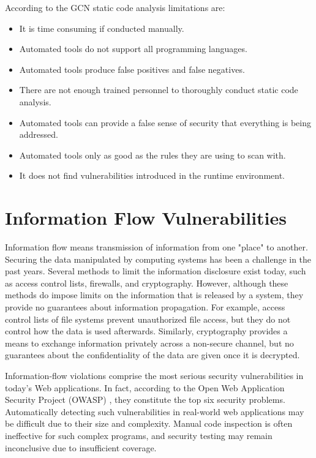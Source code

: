 According to the GCN \cite{ref_87_gcn:gcn} static code analysis limitations are:
\begin{itemize}
	\item It is time consuming if conducted manually.
	\item Automated tools do not support all programming languages.
	\item Automated tools produce false positives and false negatives.
	\item There are not enough trained personnel to thoroughly conduct static code analysis.
	\item Automated tools can provide a false sense of security that everything is being addressed.
	\item Automated tools only as good as the rules they are using to scan with.
	\item It does not find vulnerabilities introduced in the runtime environment.
\end{itemize}

\section{Information Flow Vulnerabilities}

Information flow means  transmission of information from one "place" to another. Securing the data manipulated by computing systems has been a challenge in the past years. Several methods to limit the information disclosure exist today, such as access control lists, firewalls, and cryptography. However, although these methods do impose limits on the information that is released by a system, they provide no guarantees about information propagation. For example, access control lists of file systems prevent unauthorized file access, but they do not control how the data is used afterwards. Similarly, cryptography provides a means to exchange information privately across a non-secure channel, but no guarantees about the confidentiality of the data are given once it is decrypted.

Information-flow violations \cite{ref_103_denning1977certification} comprise the most serious security
vulnerabilities in today's Web applications. In fact, according to
the Open Web Application Security Project (OWASP) \cite{ref_104_owasp:owasp}, they
constitute the top six security problems. Automatically detecting
such vulnerabilities in real-world web applications may be difficult
due to their size and complexity. Manual code inspection is often
ineffective for such complex programs, and security testing may
remain inconclusive due to insufficient coverage.

